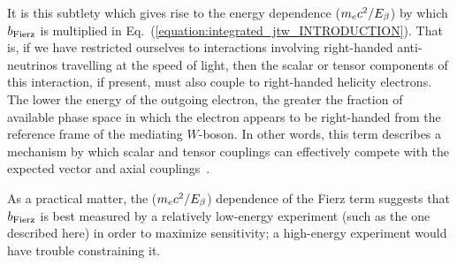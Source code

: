 It is this subtlety which gives rise to the energy dependence ($m_e c^2 / E_{\beta} $) by which $b_{\mathrm{Fierz}}$ is multiplied in Eq.~(\ref{equation:integrated_jtw_INTRODUCTION}).  
That is, if we have restricted ourselves to interactions involving right-handed anti-neutrinos travelling at the speed of light, then the scalar or tensor components of this interaction, if present, must also couple to right-handed helicity electrons.  The lower the energy of the outgoing electron, the greater the fraction of available phase space in which the electron appears to be right-handed from the reference frame of the mediating $W$-boson.  In other words, this term describes a mechanism by which scalar and tensor couplings can effectively compete with the expected vector and axial couplings~\cite{hong_sternberg_garcia,Greiner2009}.

As a practical matter, the ($m_e c^2 / E_{\beta} $) dependence of the Fierz term suggests that $b_{\mathrm{Fierz}}$ is best measured by a relatively low-energy experiment (such as the one described here) in order to maximize sensitivity;  a high-energy experiment would have trouble constraining it.




